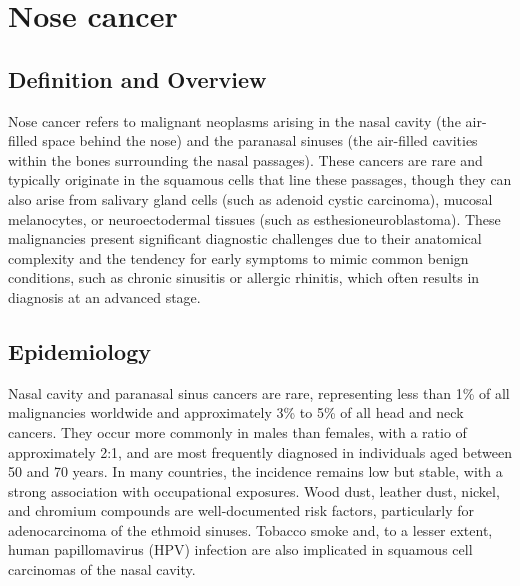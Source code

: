 \chapter{Nose cancer}

\section*{Definition and Overview}
Nose cancer refers to malignant neoplasms arising in the nasal cavity (the air-filled space behind the nose) and the paranasal sinuses (the air-filled cavities within the bones surrounding the nasal passages). These cancers are rare and typically originate in the squamous cells that line these passages, though they can also arise from salivary gland cells (such as adenoid cystic carcinoma), mucosal melanocytes, or neuroectodermal tissues (such as esthesioneuroblastoma). These malignancies present significant diagnostic challenges due to their anatomical complexity and the tendency for early symptoms to mimic common benign conditions, such as chronic sinusitis or allergic rhinitis, which often results in diagnosis at an advanced stage.

\section*{Epidemiology}
Nasal cavity and paranasal sinus cancers are rare, representing less than 1\% of all malignancies worldwide and approximately 3\% to 5\% of all head and neck cancers. They occur more commonly in males than females, with a ratio of approximately 2:1, and are most frequently diagnosed in individuals aged between 50 and 70 years. In many countries, the incidence remains low but stable, with a strong association with occupational exposures. Wood dust, leather dust, nickel, and chromium compounds are well-documented risk factors, particularly for adenocarcinoma of the ethmoid sinuses. Tobacco smoke and, to a lesser extent, human papillomavirus (HPV) infection are also implicated in squamous cell carcinomas of the nasal cavity.

